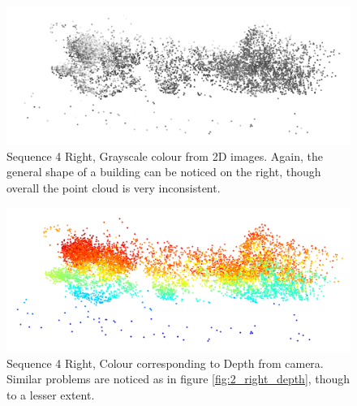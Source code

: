 \documentclass[11pt]{article}
\begin{document}
\begin{figure}[h]
	\centering
	\includegraphics[scale=0.8]{Sequence4Right_Grayscale}
	\caption{Sequence 4 Right, Grayscale colour from 2D images. Again, the general shape of a building can be noticed on the right, though overall the point cloud is very inconsistent.}
	\label{fig:4_right_gray}
\end{figure}
\begin{figure}[h]
	\centering
	\includegraphics[scale=0.8]{Sequence4Right_Depth}
	\caption{Sequence 4 Right, Colour corresponding to Depth from camera. Similar problems are noticed as in figure \ref{fig:2_right_depth}, though to a lesser extent.}
	\label{fig:4_right_depth}
\end{figure}
\end{document}
